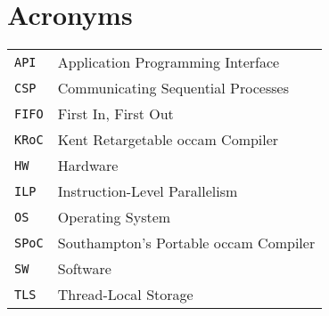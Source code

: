 
\chapter{Acronyms}

\begin{table}[h!]
    \centering
    \begin{tabular}{ll}
        \texttt{API}  & Application Programming Interface \\
        \texttt{CSP}  & Communicating Sequential Processes \\
        \texttt{FIFO} & First In, First Out \\
        \texttt{KRoC} & Kent Retargetable occam Compiler \\
        \texttt{HW}   & Hardware \\
        \texttt{ILP}  & Instruction-Level Parallelism \\
        \texttt{OS}   & Operating System \\
        \texttt{SPoC} & Southampton's Portable occam Compiler \\
        \texttt{SW}   & Software \\
        \texttt{TLS}  & Thread-Local Storage
    \end{tabular}
\end{table}